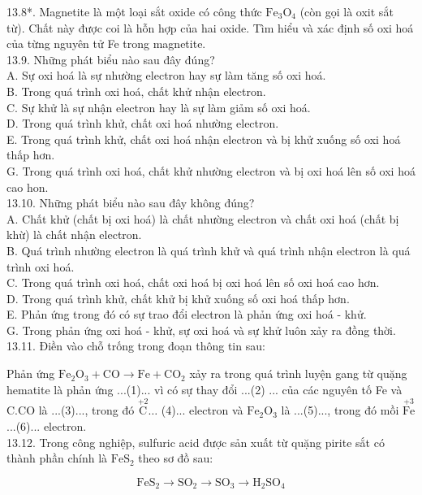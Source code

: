 \documentclass[10pt]{article}
\begin{document}
13.8*. Magnetite là một loại sắt oxide có công thức $\mathrm{Fe}_{3} \mathrm{O}_{4}$ (còn gọi là oxit sắt từ). Chất này được coi là hỗn hợp của hai oxide. Tìm hiểu và xác định số oxi hoá của từng nguyên tử Fe trong magnetite.\\
13.9. Những phát biểu nào sau đây đúng?\\
A. Sự oxi hoá là sự nhường electron hay sự làm tăng số oxi hoá.\\
B. Trong quá trình oxi hoá, chất khử nhận electron.\\
C. Sự khử là sự nhận electron hay là sự làm giảm số oxi hoá.\\
D. Trong quá trình khử, chất oxi hoá nhường electron.\\
E. Trong quá trình khử, chất oxi hoá nhận electron và bị khử xuống số oxi hoá thấp hơn.\\
G. Trong quá trình oxi hoá, chất khử nhường electron và bị oxi hoá lên số oxi hoá cao hon.\\
13.10. Những phát biểu nào sau đây không đúng?\\
A. Chất khử (chất bị oxi hoá) là chất nhường electron và chất oxi hoá (chất bị khừ) là chất nhận electron.\\
B. Quá trình nhường electron là quá trình khử và quá trình nhận electron là quá trình oxi hoá.\\
C. Trong quá trình oxi hoá, chất oxi hoá bị oxi hoá lên số oxi hoá cao hơn.\\
D. Trong quá trình khử, chất khử bị khử xuống số oxi hoá thấp hơn.\\
E. Phản ứng trong đó có sự trao đổi electron là phản ứng oxi hoá - khử.\\
G. Trong phản ứng oxi hoá - khử, sự oxi hoá và sự khử luôn xảy ra đồng thời.\\
13.11. Điền vào chỗ trống trong đoạn thông tin sau:

Phản ứng $\mathrm{Fe}_{2} \mathrm{O}_{3}+\mathrm{CO} \rightarrow \mathrm{Fe}+\mathrm{CO}_{2}$ xảy ra trong quá trình luyện gang từ quặng hematite là phản ứng ...(1)... vì có sự thay đổi ...(2) ... của các nguyên tố Fe và $\mathrm{C} . \mathrm{CO}$ là ...(3)..., trong đó $\stackrel{+2}{\mathrm{C}} \ldots$ (4)... electron và $\mathrm{Fe}_{2} \mathrm{O}_{3}$ là ...(5)..., trong đó mồi $\stackrel{+3}{\mathrm{Fe}}$...(6)... electron.\\
13.12. Trong công nghiệp, sulfuric acid được sản xuất từ quặng pirite sắt có thành phần chính là $\mathrm{FeS}_{2}$ theo sơ đồ sau:

$$
\mathrm{FeS}_{2} \rightarrow \mathrm{SO}_{2} \rightarrow \mathrm{SO}_{3} \rightarrow \mathrm{H}_{2} \mathrm{SO}_{4}
$$
\end{document}
